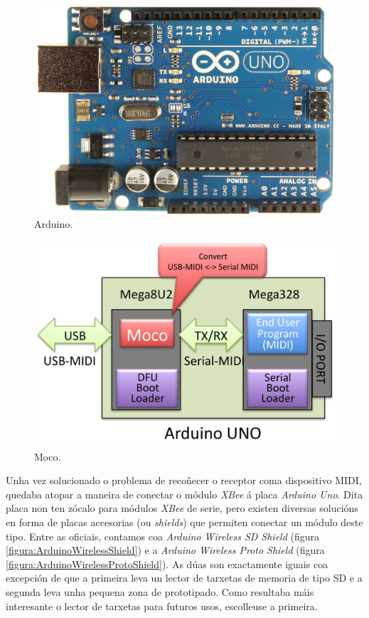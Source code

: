   \begin{figure}[htbp]
   \centering
   \includegraphics[scale=0.1,keepaspectratio=true]{./imagenes/arduino.jpg}
   \caption{Arduino.}
   \label{figura:ArduinoUno}
  \end{figure}

  \begin{figure}[htbp]
   \centering
   \includegraphics[scale=0.3,keepaspectratio=true]{./imagenes/moco.jpg}
   \caption{Moco.}
   \label{figura:Moco}
  \end{figure}

  Unha vez solucionado o problema de recoñecer o receptor coma dispositivo
  MIDI, quedaba atopar a maneira de conectar o módulo \textit{XBee} á placa
  \textit{Arduino Uno}. Dita placa non ten zócalo para módulos \textit{XBee}
  de serie, pero existen diversas solucións en forma de placas accesorias (ou
  \textit{shields}) que permiten conectar un módulo deste tipo. Entre as
  oficiais, contamos coa \textit{Arduino Wireless SD Shield}
  \cite{ArduinoWirelessShield} (figura \ref{figura:ArduinoWirelessShield}) e a
  \textit{Arduino Wireless Proto Shield} \cite{ArduinoWirelessProtoShield}
  (figura \ref{figura:ArduinoWirelessProtoShield}). As dúas son exactamente
  iguais coa excepción de que a primeira leva un lector de tarxetas de memoria
  de tipo SD e a segunda leva unha pequena zona de prototipado. Como resultaba
  máis interesante o lector de tarxetas para futuros usos, escolleuse a
  primeira.

